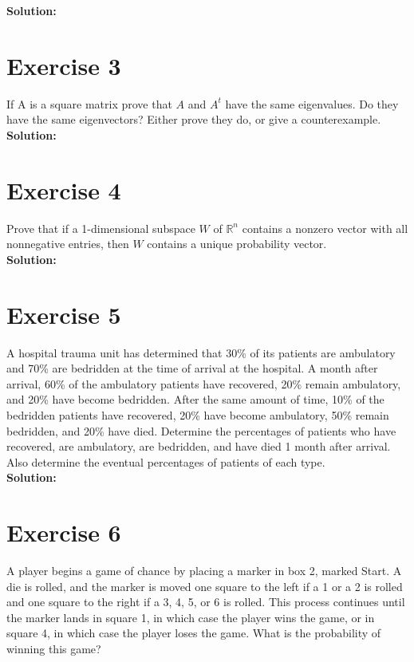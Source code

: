 \documentclass{article}
\begin{document}
\textbf{Solution:} \\



\newpage

\section*{Exercise 3}
If A is a square matrix prove that $A$ and $A^t$ have the same eigenvalues. Do they have the same eigenvectors? Either prove they do, or give a counterexample. \\

\textbf{Solution:} \\



\newpage

\section*{Exercise 4}
Prove that if a 1-dimensional subspace $W$ of $\mathbb{R}^n$ contains a nonzero vector with all nonnegative entries, then $W$ contains a unique probability vector. \\

\textbf{Solution:} \\



\newpage

\section*{Exercise 5}
A hospital trauma unit has determined that 30\% of its patients are ambulatory and 70\% are bedridden at the time of arrival at the hospital. A month after arrival, 60\% of the ambulatory patients have recovered, 20\% remain ambulatory, and 20\% have become bedridden. After the same amount of time, 10\% of the bedridden patients have recovered, 20\% have become ambulatory, 50\% remain bedridden, and 20\% have died. Determine the percentages of patients who have recovered, are ambulatory, are bedridden, and have died 1 month after arrival. Also determine the eventual percentages of patients of each type. \\

\textbf{Solution:} \\



\newpage

\section*{Exercise 6}
A player begins a game of chance by placing a marker in box 2, marked Start. A die is rolled, and the marker is moved one square to the left if a 1 or a 2 is rolled and one square to the right if a 3, 4, 5, or 6 is rolled. This process continues until the marker lands in square 1, in which case the player wins the game, or in square 4, in which case the player loses the game. What is the probability of winning this game?
\end{document}
